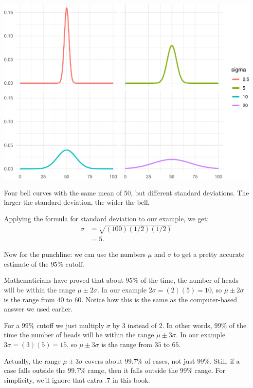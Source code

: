 \documentclass[justified]{tufte-book}
\theoremstyle{definition}
\theoremstyle{definition}
\theoremstyle{definition}
\theoremstyle{definition}
\theoremstyle{remark}
\begin{document}
\begin{marginfigure}
\includegraphics{_main_files/figure-latex/normalsds-1} \caption[Four bell curves with the same mean of $50$, but different standard deviations]{Four bell curves with the same mean of $50$, but different standard deviations. The larger the standard deviation, the wider the bell.}\label{fig:normalsds}
\end{marginfigure}

Applying the formula for standard deviation to our example, we get:
\[
  \begin{aligned}
    \sigma &= \sqrt{(100)(1/2)(1/2)}\\
           &= 5.
  \end{aligned}
\]

Now for the punchline: we can use the numbers \(\mu\) and \(\sigma\) to get a pretty accurate estimate of the \(95\%\) cutoff.

Mathematicians have proved that about \(95\%\) of the time, the number of heads will be within the range \(\mu \pm 2\sigma\). In our example \(2\sigma = (2)(5) = 10\), so \(\mu \pm 2\sigma\) is the range from \(40\) to \(60\). Notice how this is the same as the computer-based answer we used earlier.

For a \(99\%\) cutoff we just multiply \(\sigma\) by \(3\) instead of \(2\). In other words, \(99\%\) of the time the number of heads will be within the range \(\mu \pm 3\sigma\). In our example \(3\sigma = (3)(5) = 15\), so \(\mu \pm 3\sigma\) is the range from \(35\) to \(65\).

\begin{marginfigure}
Actually, the range \(\mu \pm 3\sigma\) covers about \(99.7\%\) of
cases, not just \(99\%\). Still, if a case falls outside the \(99.7\%\)
range, then it falls outside the \(99\%\) range. For simplicity, we'll
ignore that extra \(.7\) in this book.
\end{marginfigure}
\end{document}
